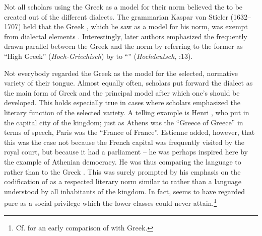Not all scholars using the Greek  as a model for their  norm believed the  to be created out of the different dialects. The grammarian Kaspar von Stieler (1632–1707) held that the Greek , which he saw as a model for his  norm, was exempt from dialectal elements \citep[2]{Stieler1691}. Interestingly, later authors emphasized the frequently drawn parallel between the Greek  and the  norm by referring to the former as “High Greek” (\textit{Hoch-Griechisch}) by  to “” (\textit{Hochdeutsch}, \citealt{Schuster1737}:13).

Not everybody regarded the Greek  as the model for the selected, normative variety of their  tongue. Almost equally often, scholars put forward the  dialect as the main form of Greek and the principal model after which one’s  should be developed. This holds especially true in cases where scholars emphasized the literary function of the selected variety. A telling example is Henri \citet[*.iii\textsc{\textsuperscript{v}}]{Estienne1582}, who put  in the capital city of the kingdom; just as Athens was the “Greece of Greece” in terms of speech, Paris was the “France of France”. Estienne added, however, that this was the case not because the French capital was frequently visited by the royal court, but because it had a parliament – he was perhaps inspired here by the example of Athenian democracy. He was thus comparing the  language to  rather than to the Greek . This was surely prompted by his emphasis on the codification of  as a respected literary norm similar to  rather than a language understood by all inhabitants of the kingdom. In fact, \citet[*.iii\textsc{\textsuperscript{r}}]{Estienne1582} seems to have regarded pure  as a social privilege which the lower classes could never attain.\footnote{Cf. \citet[\textsc{xxxiii}\textsc{\textsuperscript{v}}]{Marineo1497} for an early comparison of   with  Greek.}

